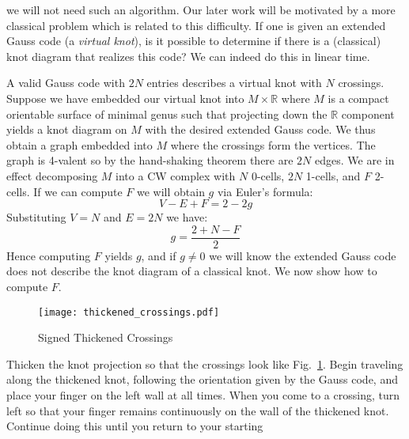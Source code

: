 \documentclass{article}
\theoremstyle{plain}
\begin{document}
        we will not need such an algorithm. Our later work will be motivated
        by a more classical problem which is related to this difficulty.
        If one is given an extended Gauss code (a \textit{virtual knot}),
        is it possible to determine if there is a (classical) knot diagram
        that realizes this code? We can indeed do this in linear time.
        \par\hfill\par
        A valid Gauss code with $2N$ entries describes a virtual knot with
        $N$ crossings. Suppose we have embedded our virtual knot into
        $M\times\mathbb{R}$ where $M$ is a compact orientable surface of
        minimal genus such that projecting down the $\mathbb{R}$ component
        yields a knot diagram on $M$ with the desired extended Gauss code.
        We thus obtain a graph embedded into $M$ where the crossings form the
        vertices. The graph is 4-valent so by the hand-shaking theorem there
        are $2N$ edges. We are in effect decomposing $M$ into a CW complex with
        $N$ 0-cells, $2N$ 1-cells, and $F$ 2-cells. If we can compute $F$ we
        will obtain $g$ via Euler's formula:
        \begin{equation}
            V-E+F=2-2g
        \end{equation}
        Substituting $V=N$ and $E=2N$ we have:
        \begin{equation}
            g=\frac{2+N-F}{2}
        \end{equation}
        Hence computing $F$ yields $g$, and if $g\ne{0}$ we will know the
        extended Gauss code does not describe the knot diagram of a
        classical knot. We now show how to compute $F$.
        \par\hfill\par
        \begin{figure}
            \centering
            \texttt{[image: thickened\_crossings.pdf]}
            \caption{Signed Thickened Crossings}
            \label{fig:thickened_crossings_chapt1}
        \end{figure}
        Thicken the knot projection so that the crossings look like
        Fig.~\ref{fig:thickened_crossings_chapt1}.
        Begin traveling along the thickened
        knot, following the orientation given by the Gauss code, and place your
        finger on the left wall at all times. When you come to a crossing,
        turn left so that your finger remains continuously on the wall of the
        thickened knot. Continue doing this until you return to your starting
\end{document}
